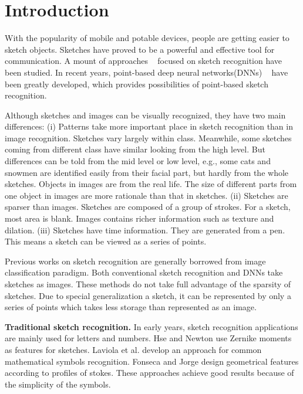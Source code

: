 \section{Introduction}
\label{sec:intro}

With the popularity of mobile and potable devices, people are getting easier to sketch objects. Sketches have proved to be a powerful and effective tool for communication. A mount of approaches ~\cite{Eitz2012HowDH, LiHSG15, Schneider2014SketchCA, Yu2015SketchaNetTB, Seddati2015DeepSketchDC, Dupont2016DeepSketch2D} focused on sketch recognition have been studied. In recent years, point-based deep neural networks(DNNs) ~\cite{qi2017pointnet, qi2017pointnetplusplus, 1801.07791} have been greatly developed, which provides possibilities of point-based sketch recognition.

Although sketches and images can be visually recognized, they have two main differences: (i) Patterns take more important place in sketch recognition than in image recognition. Sketches vary largely within class. Meanwhile, some sketches coming from different class have similar looking from the high level. But differences can be told from the mid level or low level, e.g., some cats and snowmen are identified easily from their facial part, but hardly from the whole sketches. Objects in images are from the real life. The size of different parts from one object in images are more rationale than that in sketches. (ii) Sketches are sparser than images. Sketches are composed of a group of strokes. For a sketch, most area is blank. Images contains richer information such as texture and dilation. (iii) Sketches have time information. They are generated from a pen. This means a sketch can be viewed as a series of points.

Previous works on sketch recognition are generally borrowed from image classification paradigm. Both conventional sketch recognition and DNNs take sketches as images. These methods do not take full advantage of the sparsity of sketches. Due to special generalization a sketch, it can be represented by only a series of points which takes less storage than represented as an image.

\textbf{Traditional sketch recognition.} In early years, sketch recognition applications \cite{Hse2004SketchedSR, LaViola2004MathPad2AS, Fonseca2000UsingFL} are mainly used for letters and numbers. Hse and Newton \cite{Hse2004SketchedSR} use Zernike moments as features for sketches. Laviola et al. \cite{LaViola2004MathPad2AS} develop an approach for common mathematical symbols recognition. Fonseca and Jorge \cite{Fonseca2000UsingFL} design geometrical features  according to profiles of stokes. These approaches achieve good results because of the simplicity of the symbols.


